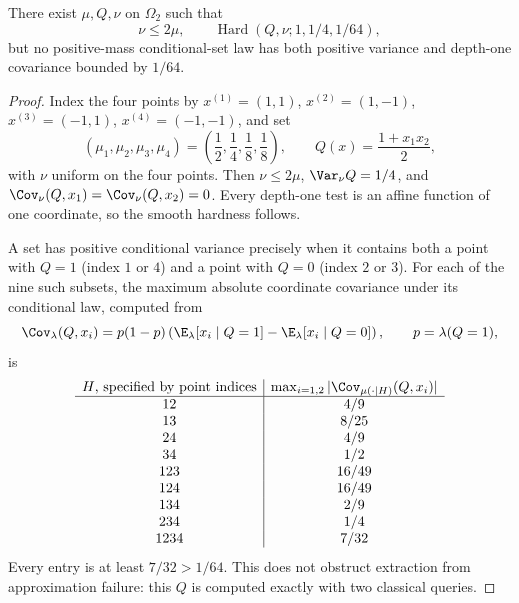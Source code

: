 \begin{proposition}
\label{ian:hard-sector-rounding-counterexample}
There exist \(\mu,Q,\nu\) on \(\Omega_2\) such that
\[
 \nu\le2\mu,\qquad
 \operatorname{Hard}(Q,\nu;1,1/4,1/64),
\]
but no positive-mass conditional-set law has both positive variance and
depth-one covariance bounded by \(1/64\).
\end{proposition}

\begin{proof}
Index the four points by
\(x^{(1)}=(1,1)\), \(x^{(2)}=(1,-1)\), \(x^{(3)}=(-1,1)\),
\(x^{(4)}=(-1,-1)\), and set
\[
 (\mu_1,\mu_2,\mu_3,\mu_4)
 =\left(\frac12,\frac14,\frac18,\frac18\right),
 \qquad Q(x)=\frac{1+x_1x_2}{2},
\]
with \(\nu\) uniform on the four points.
Then \(\nu\le2\mu\), \(\Var_\nu Q=1/4\), and
\(\Cov_\nu(Q,x_1)=\Cov_\nu(Q,x_2)=0\). Every depth-one test is an
affine function of one coordinate, so the smooth hardness follows.

A set has positive conditional variance precisely when it contains
both a point with \(Q=1\) (index \(1\) or \(4\)) and a point with
\(Q=0\) (index \(2\) or \(3\)). For each of the nine such subsets, the
maximum absolute coordinate covariance under its conditional law,
computed from
\[
 \Cov_\lambda(Q,x_i)
 =p(1-p)\left(
 \E_\lambda[x_i\mid Q=1]-\E_\lambda[x_i\mid Q=0]\right),
 \qquad p=\lambda(Q=1),
\]
is
\[
\begin{array}{c|c}
 H\text{, specified by point indices}
 &\max_{i=1,2}|\Cov_{\mu(\cdot\mid H)}(Q,x_i)|\\ \hline
 12&4/9\\
 13&8/25\\
 24&4/9\\
 34&1/2\\
 123&16/49\\
 124&16/49\\
 134&2/9\\
 234&1/4\\
 1234&7/32
\end{array}
\]
Every entry is at least \(7/32>1/64\). This does not obstruct
extraction from approximation failure: this \(Q\) is computed exactly
with two classical queries.
\end{proof}
